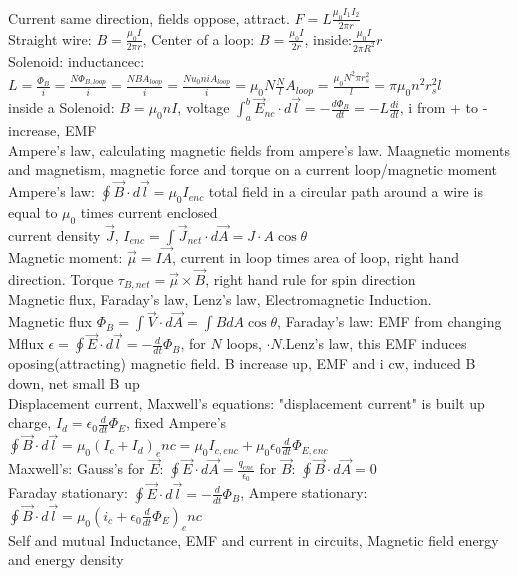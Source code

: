 \documentclass{article}
\begin{document}
\\Current same direction, fields oppose, attract. $F=L\frac{\mu_0I_1I_2}{2\pi r}$
\\Straight wire: $B=\frac{\mu_0I}{2\pi r}$, Center of a loop: $B=\frac{\mu_0I}{2r}$, inside:$\frac{\mu_0I}{2\pi R^2}r$
\\Solenoid: inductancec: $L=\frac{\Phi_B}{i}=\frac{N\Phi_{B,loop}}{i}=\frac{NBA_{loop}}{i}=\frac{Nu_0niA_{loop}}{i}=\mu_0N\frac{N}{l}A_{loop}=\frac{\mu_0N^2\pi r_s^2}{l}=\pi\mu_0n^2r_s^2l$
\\inside a Solenoid: $B=\mu_0nI$, voltage $\int_a^b\vec E_{nc}\cdot d\vec l=-\frac{d\Phi_B}{dt}=-L\frac{di}{dt}$, i from + to - increase, EMF 
\\\indent Ampere's law, calculating magnetic fields from ampere's law. Maagnetic moments and magnetism, magnetic force and torque on a current loop/magnetic moment
\\Ampere's law: $\oint\vec B\cdot d\vec l=\mu_0I_{enc}$ total field in a circular path around a wire is equal to $\mu_0$ times current enclosed
\\current density $\vec J$, $I_{enc}=\int\vec J_{net}\cdot d\vec A=J\cdot A \cos\theta$
\\Magnetic moment: $\vec \mu=I\vec A$, current in loop times area of loop, right hand direction. Torque $\tau_{B,net}=\vec\mu\times\vec B$, right hand rule for spin direction
\\\indent Magnetic flux, Faraday's law, Lenz's law, Electromagnetic Induction.
\\Magnetic flux $\Phi_B=\int\vec V\cdot d\vec A=\int B dA\cos\theta$, Faraday's law: EMF from changing Mflux $\epsilon=\oint\vec E\cdot d\vec l=-\frac{d}{dt}\Phi_B$, for $N$ loops, $\cdot N$.\qquad Lenz's law, this EMF induces oposing(attracting) magnetic field. B increase up, EMF and i cw, induced B down, net small B up 
\\\indent Displacement current, Maxwell's equations:
"displacement current" is built up charge, $I_d=\epsilon_0\frac{d}{dt}\Phi_E$, fixed Ampere's $\oint\vec B\cdot d\vec l=\mu_0(I_c+I_d)_enc=\mu_0I_{c,enc}+\mu_0\epsilon_0\frac{d}{dt}\Phi_{E,enc}$
\\Maxwell's: Gauss's for $\vec E$: $\oint\vec E\cdot d\vec A=\frac{q_{enc}}{\epsilon_0}$ for $\vec B$: $\oint\vec B\cdot d\vec A=0$
\\Faraday stationary: $\oint\vec E\cdot d\vec l=-\frac{d}{dt}\Phi_B$, Ampere stationary: $\oint\vec B\cdot d\vec l=\mu_0(i_c+\epsilon_0\frac{d}{dt}\Phi_E)_enc$
\\\indent Self and mutual Inductance, EMF and current in circuits, Magnetic field energy and energy density
\end{document}
